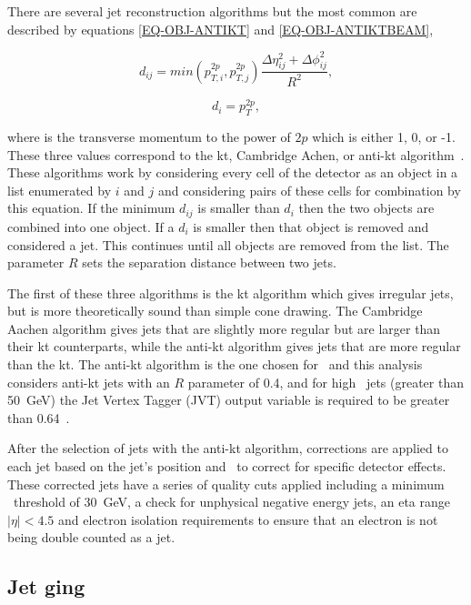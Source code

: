There are several jet reconstruction algorithms but the most common are described by equations \ref{EQ-OBJ-ANTIKT} and \ref{EQ-OBJ-ANTIKTBEAM}, 

\begin{equation}
\label{EQ-OBJ-ANTIKT}
d_{ij} = min(p^{2p}_{T,i},p^{2p}_{T,j})\frac{\Delta\eta^{2}_{ij}+\Delta\phi^{2}_{ij}}{R^{2}},
\end{equation}

\begin{equation}
\label{EQ-OBJ-ANTIKTBEAM}
d_{i} = p^{2p}_{T},
\end{equation}

\noindent where \PT is the transverse momentum to the power of $2p$ which is either 1, 0, or -1. These three values correspond to the kt, Cambridge Achen, or anti-kt algorithm~\cite{AntiKt}. These algorithms work by considering every cell of the detector as an object in a list enumerated by $i$ and $j$ and considering pairs of these cells for combination by this equation. If the minimum $d_{ij}$ is smaller than $d_i$ then the two objects are combined into one object. If a $d_i$ is smaller then that object is removed and considered a jet. This continues until all objects are removed from the list. The parameter $R$ sets the separation distance between two jets.  

The first of these three algorithms is the kt algorithm which gives irregular jets, but is more theoretically sound than simple cone drawing. The Cambridge Aachen algorithm gives jets that are slightly more regular but are larger than their kt counterparts, while the anti-kt algorithm gives jets that are more regular than the kt. The anti-kt algorithm is the one chosen for \atlas~and this analysis considers anti-kt jets with an $R$ parameter of 0.4, and for high \PT~jets (greater than 50~GeV) the Jet Vertex Tagger (JVT) output variable is required to be greater than 0.64~\cite{ATLAS-CONF-2014-018}. 

After the selection of jets with the anti-kt algorithm, corrections are applied to each jet based on the jet's position and \PT~to correct for specific detector effects. These corrected jets have a series of quality cuts applied including a minimum \PT~threshold of 30~GeV, a check for unphysical negative energy jets, an eta range $|\eta| < 4.5$ and electron isolation requirements to ensure that an electron is not being double counted as a jet. 


\subsection{Jet \btag ging}
\label{SECTION-OBJ-JET-BTAG}

